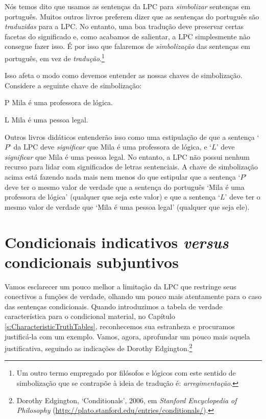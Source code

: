 Nós temos dito que usamos as sentenças da LPC para \emph{simbolizar} sentenças em português.
Muitos outros livros preferem dizer que as sentenças do português são \emph{traduzidas} para a LPC.
No entanto, uma boa tradução deve preservar certas facetas do significado e, como acabamos de salientar, a LPC simplesmente não consegue fazer isso.
É por isso que falaremos de \emph{simbolização} das sentenças em português, em vez de \emph{tradução}.\footnote{
Um outro termo empregado por filósofos e lógicos com este sentido de simbolização que se contrapõe à ideia de tradução é: \emph{arregimentação}.}

Isso afeta o modo como devemos entender as nossas chaves de simbolização.
Considere a seguinte chave de simbolização:
	\begin{ekey}
		\item[P] Mila é uma professora de lógica.
		\item[L] Mila é uma pessoa legal.
	\end{ekey}
Outros livros didáticos entenderão isso como uma estipulação de que a sentença `$P$' da LPC deve \emph{significar} que Mila é uma professora de lógica, e `$L$' deve \emph{significar} que Mila é uma pessoa legal.
No entanto, a LPC não possui nenhum recurso para lidar com significados de letras sentenciais.
A chave de simbolização acima está fazendo nada mais nem menos do que estipular que a sentença `$P$' deve ter o mesmo valor de verdade que a sentença do português `Mila é uma professora de lógica' (qualquer que seja este valor) e que a sentença `$L$' deve ter o mesmo valor de verdade que `Mila é uma pessoa legal' (qualquer que seja ele).

\section[Indicativo \emph{versus} subjuntivo]{Condicionais indicativos \emph{versus} condicionais subjuntivos}\label{s:IndicativeSubjunctive}
Vamos esclarecer um pouco melhor a limitação da LPC que restringe seus conectivos a funções de verdade, olhando um pouco mais atentamente para o caso das sentenças condicionais.
Quando introduzimos a tabela de verdade característica para o condicional material, no Capítulo \ref{s:CharacteristicTruthTables}, reconhecemos sua estranheza e procuramos justificá-la com um exemplo.
Vamos, agora, aprofundar um pouco mais aquela justificativa, seguindo as indicações de Dorothy Edgington.\footnote{Dorothy Edgington, `Conditionals', 2006, em \emph{Stanford Encyclopedia of Philosophy} (\url{http://plato.stanford.edu/entries/conditionals/}).} 

